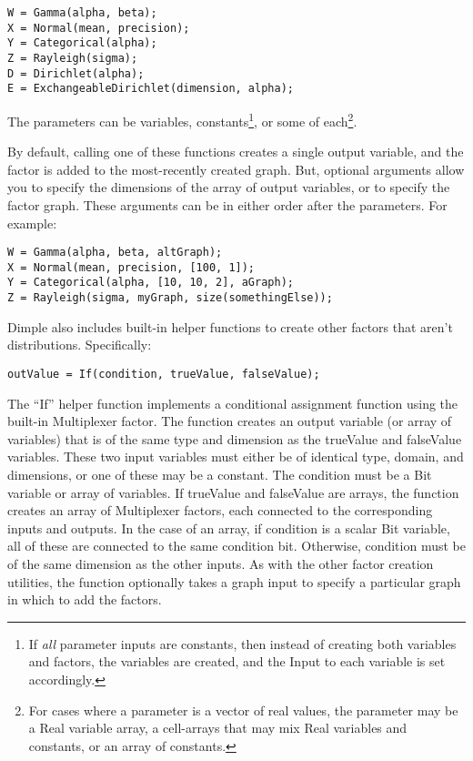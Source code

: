 \begin{lstlisting}
W = Gamma(alpha, beta);
X = Normal(mean, precision);
Y = Categorical(alpha);
Z = Rayleigh(sigma);
D = Dirichlet(alpha);
E = ExchangeableDirichlet(dimension, alpha);
\end{lstlisting}


The parameters can be variables, constants\footnote{If \emph{all} parameter inputs are constants, then instead of creating both variables and factors, the variables are created, and the Input to each variable is set accordingly.}, or some of each\footnote{For cases where a parameter is a vector of real values, the parameter may be a Real variable array, a cell-arrays that may mix Real variables and constants, or an array of constants.}.

By default, calling one of these functions creates a single output variable, and the factor is added to the most-recently created graph. But, optional arguments allow you to specify the dimensions of the array of output variables, or to specify the factor graph. These arguments can be in either order after the parameters. For example:

\begin{lstlisting}
W = Gamma(alpha, beta, altGraph);
X = Normal(mean, precision, [100, 1]);
Y = Categorical(alpha, [10, 10, 2], aGraph);
Z = Rayleigh(sigma, myGraph, size(somethingElse));
\end{lstlisting}

\fi

\ifmatlab
Dimple also includes built-in helper functions to create other factors that aren't distributions.  Specifically:

\begin{lstlisting}
outValue = If(condition, trueValue, falseValue);
\end{lstlisting}

The ``If'' helper function implements a conditional assignment function using the built-in Multiplexer factor.  The function creates an output variable (or array of variables) that is of the same type and dimension as the trueValue and falseValue variables.  These two input variables must either be of identical type, domain, and dimensions, or one of these may be a constant.  The condition must be a Bit variable or array of variables.  If trueValue and falseValue are arrays, the function creates an array of Multiplexer factors, each connected to the corresponding inputs and outputs.  In the case of an array, if condition is a scalar Bit variable, all of these are connected to the same condition bit.  Otherwise, condition must be of the same dimension as the other inputs.  As with the other factor creation utilities, the function optionally takes a graph input to specify a particular graph in which to add the factors.
\fi

